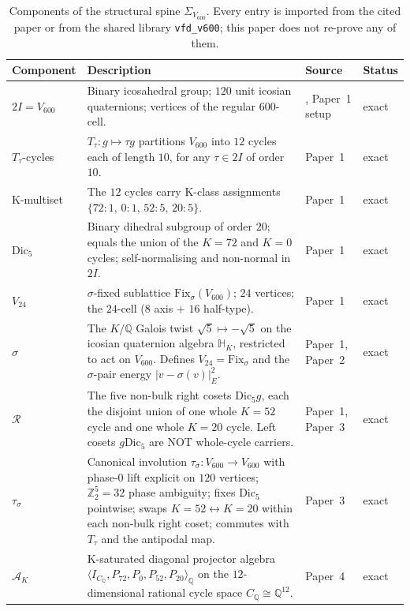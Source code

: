 \documentclass[11pt]{article}
\theoremstyle{remark}
\newcommand{\twoI}{2I}
\newcommand{\Vsixhundred}{V_{600}}
\newcommand{\Dicfive}{\mathrm{Dic}_5}
\newcommand{\Vtwentyfour}{V_{24}}
\newcommand{\Sigmaspine}{\Sigma_{\Vsixhundred}}
\newcommand{\CQ}{C_{\mathbb{Q}}}
\newcommand{\Ttau}{T_{\tau}}
\newcommand{\sigmaG}{\sigma}
\newcommand{\tausigma}{\tau_\sigma}
\newcommand{\AK}{\mathcal{A}_K}
\newcommand{\PK}[1]{P_{#1}}
\begin{document}
\begin{table}[h]
\centering
\caption{Components of the structural spine $\Sigmaspine$. Every
entry is imported from the cited paper or from the shared library
\texttt{vfd\_v600}; this paper does not re-prove any of them.}
\label{tab:spine}
\renewcommand{\arraystretch}{1.15}
\begin{tabular}{p{3cm}p{6cm}p{3cm}p{2cm}}
\toprule
Component & Description & Source & Status \\
\midrule
$\twoI = \Vsixhundred$ & Binary icosahedral group; $120$ unit
icosian quaternions; vertices of the regular $600$-cell. &
\citet{Coxeter1973,ConwaySloane1988}, Paper~1 setup & exact \\
$\Ttau$-cycles & $T_\tau : g \mapsto \tau g$ partitions
$\Vsixhundred$ into $12$ cycles each of length $10$, for any
$\tau \in \twoI$ of order $10$. & Paper~1 & exact \\
K-multiset & The $12$ cycles carry K-class assignments
$\{72{:}1,\,0{:}1,\,52{:}5,\,20{:}5\}$. & Paper~1 & exact \\
$\Dicfive$ & Binary dihedral subgroup of order $20$; equals the
union of the $K=72$ and $K=0$ cycles; self-normalising and non-normal
in $\twoI$. & Paper~1 & exact \\
$\Vtwentyfour$ & $\sigmaG$-fixed sublattice
$\mathrm{Fix}_\sigma(\Vsixhundred)$; $24$ vertices; the
$24$-cell ($8$ axis $+$ $16$ half-type). & Paper~1 & exact \\
$\sigmaG$ & The $K/\mathbb{Q}$ Galois twist
$\sqrt{5} \mapsto -\sqrt{5}$ on the icosian quaternion algebra
$\mathbb{H}_K$, restricted to act on $\Vsixhundred$. Defines
$\Vtwentyfour = \mathrm{Fix}_\sigma$ and the $\sigmaG$-pair energy
$|v - \sigmaG(v)|_E^2$. & Paper~1, Paper~2 & exact \\
$\mathcal{R}$ & The five non-bulk right cosets $\Dicfive g$, each
the disjoint union of one whole $K{=}52$ cycle and one whole
$K{=}20$ cycle. Left cosets $g\Dicfive$ are NOT whole-cycle carriers.
& Paper~1, Paper~3 & exact \\
$\tausigma$ & Canonical involution
$\tausigma : \Vsixhundred \to \Vsixhundred$ with phase-$0$ lift
explicit on $120$ vertices; $\mathbb{Z}_2^5 = 32$ phase ambiguity;
fixes $\Dicfive$ pointwise; swaps $K=52 \leftrightarrow K=20$ within
each non-bulk right coset; commutes with $\Ttau$ and the antipodal
map. & Paper~3 & exact \\
$\AK$ & K-saturated diagonal projector algebra
$\langle I_{\CQ}, \PK{72}, \PK{0}, \PK{52}, \PK{20}\rangle_\mathbb{Q}$
on the $12$-dimensional rational cycle space $\CQ \cong \mathbb{Q}^{12}$.
& Paper~4 & exact \\
\bottomrule
\end{tabular}
\end{table}
\end{document}
